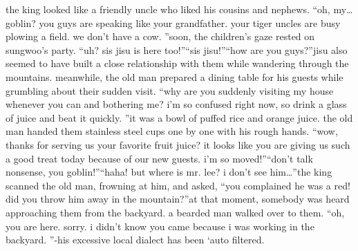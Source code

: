  the king looked like a friendly uncle who liked his cousins and nephews.
“oh, my…goblin? you guys are speaking like your grandfather.
 your tiger uncles are busy plowing a field.
 we don’t have a cow.
”soon, the children’s gaze rested on sungwoo’s party.
“uh? sis jisu is here too!”“sis jisu!”“how are you guys?”jisu also seemed to have built a close relationship with them while wandering through the mountains.
meanwhile, the old man prepared a dining table for his guests while grumbling about their sudden visit.
“why are you suddenly visiting my house whenever you can and bothering me? i’m so confused right now, so drink a glass of juice and beat it quickly.
”it was a bowl of puffed rice and orange juice.
 the old man handed them stainless steel cups one by one with his rough hands.
“wow, thanks for serving us your favorite fruit juice? it looks like you are giving us such a good treat today because of our new guests.
 i’m so moved!”“don’t talk nonsense, you goblin!”“haha! but where is mr.
 lee? i don’t see him…”the king scanned the old man, frowning at him, and asked, “you complained he was a red! did you throw him away in the mountain?”at that moment, somebody was heard approaching them from the backyard.
a bearded man walked over to them.
“oh, you are here.
 sorry.
 i didn’t know you came because i was working in the backyard.
”-his excessive local dialect has been ‘auto filtered.


